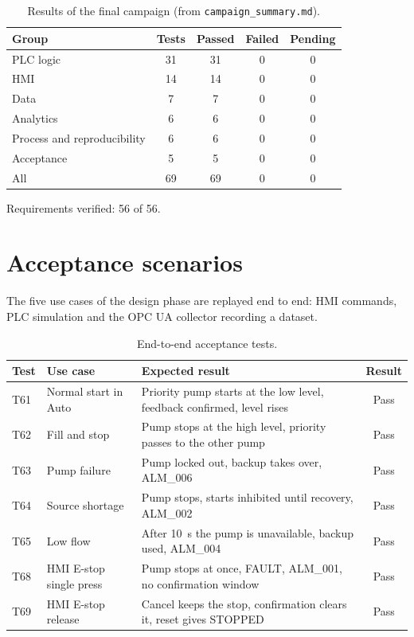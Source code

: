 \documentclass[11pt,a4paper]{report}
\begin{document}
	\begin{table}[H]\centering\small
		\begin{tabularx}{\linewidth}{|l|c|c|c|c|}
			\hline
			Group & Tests & Passed & Failed & Pending \\
			\hline
			PLC logic & 31 & 31 & 0 & 0 \\
			HMI & 14 & 14 & 0 & 0 \\
			Data & 7 & 7 & 0 & 0 \\
			Analytics & 6 & 6 & 0 & 0 \\
			Process and reproducibility & 6 & 6 & 0 & 0 \\
			Acceptance & 5 & 5 & 0 & 0 \\
			All & 69 & 69 & 0 & 0 \\
			\hline
		\end{tabularx}
		\caption{Results of the final campaign (from \texttt{campaign\_summary.md}).}\label{tab:results}
	\end{table}
	
	Requirements verified: 56 of 56.
	
	\section{Acceptance scenarios}
	
	The five use cases of the design phase are replayed end to end: HMI commands, PLC simulation and the OPC UA collector recording a dataset.
	
	\begin{table}[H]\centering\small
		\begin{tabularx}{\linewidth}{|l|l|Y|c|}
			\hline
			Test & Use case & Expected result & Result \\
			\hline
			T61 & Normal start in Auto & Priority pump starts at the low level, feedback confirmed, level rises & Pass \\
			T62 & Fill and stop & Pump stops at the high level, priority passes to the other pump & Pass \\
			T63 & Pump failure & Pump locked out, backup takes over, ALM\_006 & Pass \\
			T64 & Source shortage & Pump stops, starts inhibited until recovery, ALM\_002 & Pass \\
			T65 & Low flow & After 10~s the pump is unavailable, backup used, ALM\_004 & Pass \\
			T68 & HMI E-stop single press & Pump stops at once, FAULT, ALM\_001, no confirmation window & Pass \\
			T69 & HMI E-stop release & Cancel keeps the stop, confirmation clears it, reset gives STOPPED & Pass \\
			\hline
		\end{tabularx}
		\caption{End-to-end acceptance tests.}\label{tab:acceptance}
	\end{table}
	
\end{document}
